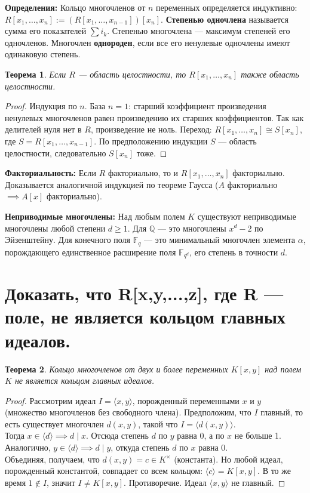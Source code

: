 \documentclass[12pt, a4paper]{article}
\theoremstyle{definition}
\theoremstyle{plain}
\newtheorem{theorem}{Теорема}[section]
\begin{document}
	\textbf{Определения:} Кольцо многочленов от $n$ переменных определяется индуктивно: $R[x_1, \dots, x_n] := (R[x_1, \dots, x_{n-1}])[x_n]$. \textbf{Степенью одночлена} называется сумма его показателей $\sum i_k$. Степенью многочлена — максимум степеней его одночленов. Многочлен \textbf{однороден}, если все его ненулевые одночлены имеют одинаковую степень.
	
	\begin{theorem}
		Если $R$ — область целостности, то $R[x_1, \dots, x_n]$ также область целостности.
	\end{theorem}
	\begin{proof}
		Индукция по $n$. База $n=1$: старший коэффициент произведения ненулевых многочленов равен произведению их старших коэффициентов. Так как делителей нуля нет в $R$, произведение не ноль. Переход: $R[x_1, \dots, x_n] \cong S[x_n]$, где $S = R[x_1, \dots, x_{n-1}]$. По предположению индукции $S$ — область целостности, следовательно $S[x_n]$ тоже.
	\end{proof}
	
	\textbf{Факториальность:} Если $R$ факториально, то и $R[x_1, \dots, x_n]$ факториально. Доказывается аналогичной индукцией по теореме Гаусса ($A$ факториально $\implies A[x]$ факториально).
	
	\textbf{Неприводимые многочлены:} Над любым полем $K$ существуют неприводимые многочлены любой степени $d \ge 1$. Для $\mathbb{Q}$ — это многочлены $x^d-2$ по Эйзенштейну. Для конечного поля $\mathbb{F}_q$ — это минимальный многочлен элемента $\alpha$, порождающего единственное расширение поля $\mathbb{F}_{q^d}$, его степень в точности $d$.
	
	\newpage
	\section{Доказать, что R[x,y,...,z], где R --- поле, не является кольцом главных идеалов.}
	
	\begin{theorem}
		Кольцо многочленов от двух и более переменных $K[x, y]$ над полем $K$ не является кольцом главных идеалов.
	\end{theorem}
	\begin{proof}
		Рассмотрим идеал $I = \langle x, y \rangle$, порожденный переменными $x$ и $y$ (множество многочленов без свободного члена). Предположим, что $I$ главный, то есть существует многочлен $d(x,y)$, такой что $I = \langle d(x,y) \rangle$. \\
		Тогда $x \in \langle d \rangle \implies d \mid x$. Отсюда степень $d$ по $y$ равна 0, а по $x$ не больше 1. \\
		Аналогично, $y \in \langle d \rangle \implies d \mid y$, откуда степень $d$ по $x$ равна 0. \\
		Объединяя, получаем, что $d(x,y) = c \in K^\times$ (константа). Но любой идеал, порожденный константой, совпадает со всем кольцом: $\langle c \rangle = K[x,y]$. В то же время $1 \notin I$, значит $I \neq K[x,y]$. Противоречие. Идеал $\langle x,y \rangle$ не главный.
	\end{proof}
	
\end{document}
